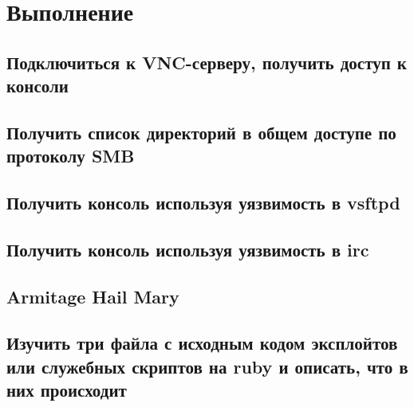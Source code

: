 \documentclass[utf8x, 12pt]{G7-32}
\begin{document}
\chapter{Выполнение}


\section{Подключиться к VNC-серверу, получить доступ к консоли}
\section{Получить список директорий в общем доступе по протоколу SMB}
\section{Получить консоль используя уязвимость в vsftpd}
\section{Получить консоль используя уязвимость в irc}
\section{Armitage Hail Mary}
\section{Изучить три файла с исходным кодом эксплойтов или служебных скриптов на ruby и описать, что в них происходит}


\begin{figure}[hhh!]
	\begin{center}
	\end{center}
\end{figure}	
\end{document}
